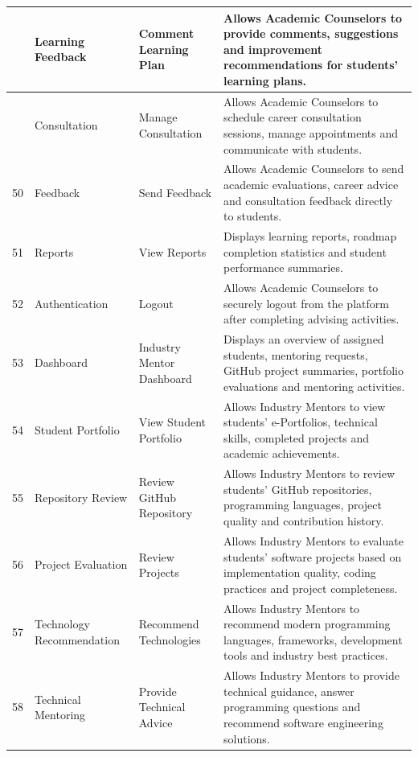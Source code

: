 \begin{longtable}{|>{\centering\arraybackslash}p{0.8cm}|p{3.2cm}|p{3.5cm}|p{8cm}|}
48 &
Learning Feedback &
Comment Learning Plan &
Allows Academic Counselors to provide comments, suggestions and improvement recommendations for students' learning plans.
\\
\hline

49 &
Consultation &
Manage Consultation &
Allows Academic Counselors to schedule career consultation sessions, manage appointments and communicate with students.
\\
\hline

50 &
Feedback &
Send Feedback &
Allows Academic Counselors to send academic evaluations, career advice and consultation feedback directly to students.
\\
\hline

51 &
Reports &
View Reports &
Displays learning reports, roadmap completion statistics and student performance summaries.
\\
\hline

52 &
Authentication &
Logout &
Allows Academic Counselors to securely logout from the platform after completing advising activities.
\\
\hline

53 &
Dashboard &
Industry Mentor Dashboard &
Displays an overview of assigned students, mentoring requests, GitHub project summaries, portfolio evaluations and mentoring activities.
\\
\hline

54 &
Student Portfolio &
View Student Portfolio &
Allows Industry Mentors to view students' e-Portfolios, technical skills, completed projects and academic achievements.
\\
\hline

55 &
Repository Review &
Review GitHub Repository &
Allows Industry Mentors to review students' GitHub repositories, programming languages, project quality and contribution history.
\\
\hline

56 &
Project Evaluation &
Review Projects &
Allows Industry Mentors to evaluate students' software projects based on implementation quality, coding practices and project completeness.
\\
\hline

57 &
Technology Recommendation &
Recommend Technologies &
Allows Industry Mentors to recommend modern programming languages, frameworks, development tools and industry best practices.
\\
\hline

58 &
Technical Mentoring &
Provide Technical Advice &
Allows Industry Mentors to provide technical guidance, answer programming questions and recommend software engineering solutions.
\\
\hline


\end{longtable}
